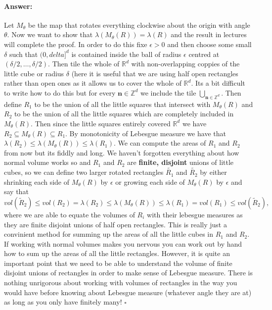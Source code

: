 \documentclass[11pt]{article}
\theoremstyle{definition}
\theoremstyle{remark}
\newenvironment{ans}{\paragraph{Answer:}}{\hfill$\square$}
\begin{document}
\begin{ans}
Let $M_\theta$ be the map that rotates everything clockwise about the origin with angle $\theta$. Now we want to show that $\lambda(M_\theta(R)) = \lambda(R)$ and the result in lectures will complete the proof. In order to do this fixe $\epsilon >0$ and then choose some small $\delta$ such that $(0, delta]^d$ is contained inside the ball of radius $\epsilon$ centred at $(\delta/2, \dots, \delta/2)$. Then tile the whole of $\mathbb{R}^d$ with non-overlapping coppies of the little cube or radius $\delta$ (here it is useful that we are using half open rectangles rather than open ones as it allows us to cover the whole of $\mathbb{R}^d$. Its a bit difficult to write how to do this but for every $\mathbf{n} \in \mathbb{Z}^d$ we include the tile $\bigcup_{\mathbf{n} \in \mathbb{Z}^d}$. Then define $R_1$ to be the union of all the little squares that intersect with $M_\theta(R)$ and $R_2$ to be the union of all the little squares which are completely included in $M_\theta(R)$. Then since the little squares entirely covered $\mathbb{R}^d$ we have $R_2 \subseteq M_\theta(R) \subseteq R_1$. By monotonicity of Lebesgue measure we have that $\lambda(R_2) \leq \lambda(M_\theta(R)) \leq \lambda(R_1)$. We can compute the areas of $R_1$ and $R_2$ from now but its fiddly and long. We haven't forgotten everything about how normal volume works so and $R_1$ and $R_2$ are \textbf{finite, disjoint} unions of little cubes, so we can define two larger rotated rectangles $\tilde{R_1}$ and $\tilde{R_2}$ by either shrinking each side of $M_\theta(R)$ by $\epsilon$ or growing each side of $M_\theta(R)$ by $\epsilon$ and say that
\[ vol(\tilde{R}_2) \leq vol(R_2) = \lambda(R_2) \leq \lambda(M_\theta(R)) \leq \lambda(R_1)=vol(R_1) \leq vol(\tilde{R}_2), \] where we are able to equate the volumes of $R_i$ with their lebesgue measures as they are finite disjoint unions of half open rectangles. This is really just a convinient method for summing up the areas of all the little cubes in $R_1$ and $R_2$. If working with normal volumes makes you nervous you can work out by hand how to sum up the areas of all the little rectangles. However, it is quite an important point that we need to be able to understand the volume of finite disjoint unions of rectangles in order to make sense of Lebesgue measure. There is nothing unrigorous about working with volumes of rectangles in the way you would have before knowing about Lebesgue measure (whatever angle they are at) as long as you only have finitely many!
\end{ans}
\end{document}
